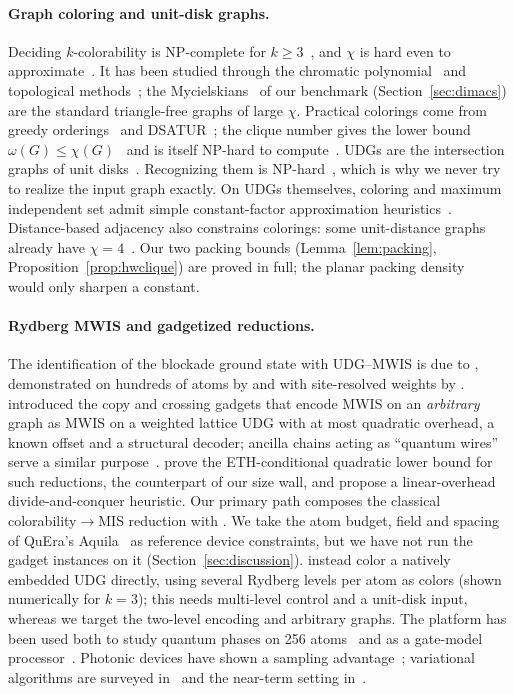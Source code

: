 \documentclass[a4paper,fleqn]{cas-sc}
\begin{document}
\paragraph{Graph coloring and unit-disk graphs.} Deciding $k$-colorability is
NP-complete for $k\ge3$~\cite{Karp1972,GareyJohnson1979}, and $\chi$ is hard even to
approximate~\cite{Zuckerman2007}. It has been studied through the chromatic polynomial~\cite{Tutte1954}
and topological methods~\cite{Lovasz1978}; the Mycielskians~\cite{Mycielski1955} of our benchmark
(Section~\ref{sec:dimacs}) are the standard triangle-free graphs of large $\chi$.
Practical colorings come from greedy orderings~\cite{Welsh1967} and
DSATUR~\cite{Brelaz1979}; the clique number gives the lower bound
$\omega(G)\le\chi(G)$~\cite{West2001} and is itself NP-hard to compute~\cite{Bomze1999}.
UDGs are the intersection graphs of unit disks~\cite{Clark1990UDG}. Recognizing them is
NP-hard~\cite{Breu1998,KangMuller2012}, which is why we never try to realize the input
graph exactly. On UDGs themselves, coloring and maximum independent set admit simple
constant-factor approximation heuristics~\cite{Marathe1995}. Distance-based adjacency
also constrains colorings: some unit-distance graphs already have
$\chi=4$~\cite{MoserMoser1961}. Our two packing bounds
(Lemma~\ref{lem:packing}, Proposition~\ref{prop:hwclique}) are proved in full; the
planar packing density~\cite{FejesToth1953} would only sharpen a constant.

\paragraph{Rydberg MWIS and gadgetized reductions.} The identification of the
blockade ground state with UDG--MWIS is due to \citet{Pichler2018}, demonstrated on
hundreds of atoms by \citet{Ebadi2022} and with site-resolved weights by
\citet{deOliveira2025}. \citet{Nguyen2023} introduced the copy and crossing gadgets that
encode MWIS on an \emph{arbitrary} graph as MWIS on a weighted lattice UDG with at
most quadratic overhead, a known offset and a structural decoder; ancilla chains
acting as ``quantum wires'' serve a similar purpose~\cite{Kim2022}.
\citet{Cazals2025} prove the ETH-conditional quadratic lower bound for such reductions,
the counterpart of our size wall, and propose a linear-overhead divide-and-conquer
heuristic. Our primary path composes the classical colorability$\to$MIS reduction with
\citet{Nguyen2023}. We take the atom budget, field and spacing of QuEra's
Aquila~\cite{Wurtz2023} as reference device constraints, but we have not run the
gadget instances on it (Section~\ref{sec:discussion}). \citet{Angkhanawin2026} instead color a natively embedded UDG directly, using
several Rydberg levels per atom as colors (shown numerically for $k=3$); this needs
multi-level control and a unit-disk input, whereas we target the two-level encoding
and arbitrary graphs. The platform has been used both to study quantum phases on
256 atoms~\cite{Ebadi2021} and as a gate-model processor~\cite{Graham2022}. Photonic
devices have shown a sampling advantage~\cite{Madsen2022}; variational algorithms are
surveyed in~\cite{Cerezo2021} and the near-term setting in~\cite{Preskill2018}.
\end{document}
